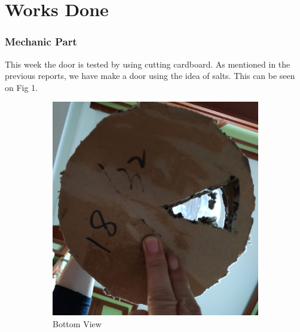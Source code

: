\section{Works Done}
\label{sec:worksDone}
\subsubsection{Mechanic Part}
This week the door is tested by using cutting cardboard. As mentioned in the previous reports, we have make a door using the idea of salts. This can be seen on Fig 1.

\begin{figure}[h]
    \centering
    \begin{subfigure}[b]{0.49\linewidth}
        \includegraphics[width=\linewidth]{Mech2.jpeg}
        \caption{Bottom View}
        \label{fig:doga1}
    \end{subfigure}
    \begin{subfigure}[b]{0.49\linewidth}

\end{subfigure}
\end{figure}
